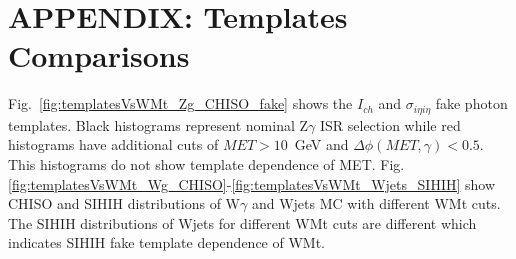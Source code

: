 \section{APPENDIX: Templates Comparisons}
\label{sec:CompareTemplatesPlots}

Fig.~\ref{fig:templatesVsWMt_Zg_CHISO_fake} shows the $I_{ch}$ and $\sigma_{i\eta i\eta}$ fake photon templates. Black histograms represent nominal Z$\gamma$ ISR selection while red histograms have additional cuts of $MET>10$~GeV and $\Delta \phi(MET,\gamma)<0.5$. This histograms do not show template dependence of MET. Fig. \ref{fig:templatesVsWMt_Wg_CHISO}-\ref{fig:templatesVsWMt_Wjets_SIHIH} show CHISO and SIHIH distributions of W$\gamma$ and Wjets MC with different WMt cuts. The SIHIH distributions of Wjets for different WMt cuts are different which indicates SIHIH fake template dependence of WMt.\\

